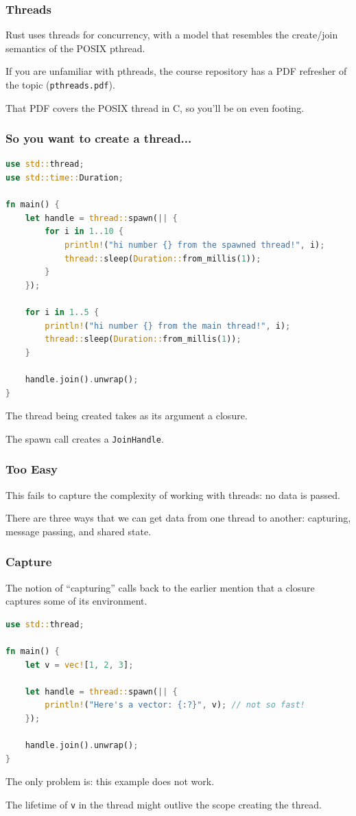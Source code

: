\begin{frame}
\frametitle{Threads}

Rust uses threads for concurrency, with a model that resembles the create/join semantics of the POSIX pthread. 

If you are unfamiliar with pthreads, the course repository has a PDF refresher of the topic (\texttt{pthreads.pdf}).

That PDF covers the POSIX thread in C, so you'll be on even footing.

\end{frame}


\begin{frame}[fragile]
\frametitle{So you want to create a thread...}

\begin{lstlisting}[language=Rust]
use std::thread;
use std::time::Duration;

fn main() {
    let handle = thread::spawn(|| {
        for i in 1..10 {
            println!("hi number {} from the spawned thread!", i);
            thread::sleep(Duration::from_millis(1));
        }
    });

    for i in 1..5 {
        println!("hi number {} from the main thread!", i);
        thread::sleep(Duration::from_millis(1));
    }

    handle.join().unwrap();
}
\end{lstlisting}

The thread being created takes as its argument a \alert{closure}.


The spawn call creates a \texttt{JoinHandle}.
\end{frame}


\begin{frame}
\frametitle{Too Easy}

This fails to capture the complexity of working with threads: no data is passed.

There are three ways that we can get data from one thread to another: capturing, message passing, and shared state.

\end{frame}


\begin{frame}[fragile]
\frametitle{Capture}

The notion of ``capturing'' calls back to the earlier mention that a closure captures some of its environment. 

\begin{lstlisting}[language=Rust]
use std::thread;

fn main() {
    let v = vec![1, 2, 3];

    let handle = thread::spawn(|| {
        println!("Here's a vector: {:?}", v); // not so fast!
    });

    handle.join().unwrap();
}
\end{lstlisting}

The only problem is: this example does not work.

The lifetime of \texttt{v} in the thread might outlive the scope creating the thread.

\end{frame}


